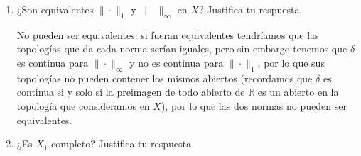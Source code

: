 \documentclass[12pt]{article}
\begin{document}
\begin{ejercicio}[2 puntos]
\begin{enumerate}[label=\alph*)]
\begin{description}
\begin{figure}[h]
                        \caption{Gráfica de la función $f_n$.}
                        \label{fig:funcion23}
                    \end{figure}

                    Tenemos que $f_n\in \ker(\delta)$, así como que:
                    \begin{align*}
                        \|f_n - 1\|_1 &= \int_{0}^{1} |f_n(t) - 1|~dt  = \int_{0}^{1} (1 - f_n(t))~dt  =\\&= \int_{0}^{\nicefrac{1}{n}}(1 - f_n(t)) ~dt  + \int_{\nicefrac{1}{n}}^{1} (1 - f_n(t))~dt  \leq \frac{1}{n} + 0
                    \end{align*}

                    Por tanto, $\|f_n - 1\|_1 \to 0$ cuando $n\to \infty$, es decir, $f_n \to 1$ en $X_1$. Como $1\notin \ker(\delta)$, se deduce que $\ker(\delta)$ no es cerrado en $X_1$, y por tanto $\delta$ no es continua para $\|\cdot \|_1$.
                    
                    
                \end{description}

            \item ¿Son equivalentes $\|\cdot \|_1$ y $\|\cdot \|_\infty$ en $X$? Justifica tu respuesta.

                No pueden ser equivalentes: si fueran equivalentes tendríamos que las topologías que da cada norma serían iguales, pero sin embargo tenemos que $\delta$ es continua para $\|\cdot \|_\infty$ y no es continua para $\|\cdot \|_1$, por lo que sus topologías no pueden contener los mismos abiertos (recordamos que $\delta$ es continua si y solo si la preimagen de todo abierto de $\mathbb{R}$ es un abierto en la topología que consideramos en $X$), por lo que las dos normas no pueden ser equivalentes.
            \item ¿Es $X_1$ completo? Justifica tu respuesta.
            


\end{enumerate}
\end{ejercicio}
\end{document}
